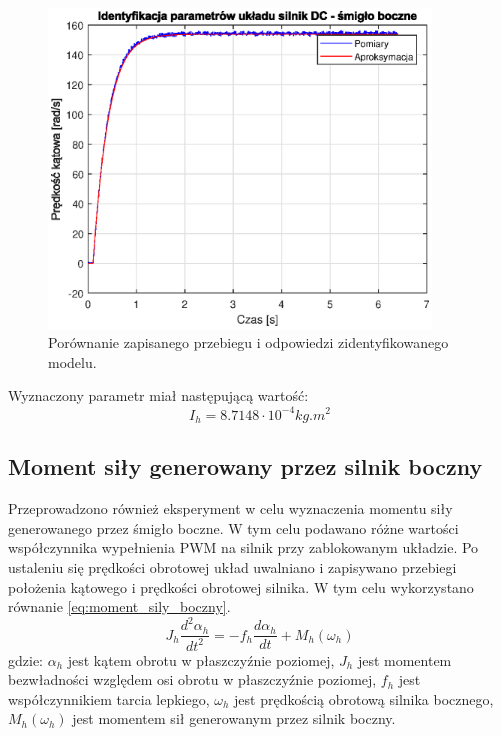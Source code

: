 \documentclass[11pt,a4paper]{article}
\begin{document}
\begin{figure}[H]
	\centering
	\includegraphics[width=4in]{Figures/ident_I_h.eps}
	\caption{Porównanie zapisanego przebiegu i odpowiedzi zidentyfikowanego modelu.}
	\label{fig:ident_I_h}
\end{figure}

Wyznaczony parametr miał następującą wartość:
\begin{equation}
I_h = 8.7148\cdot 10^{-4}\si{kg.m^2}
\end{equation}

\subsection{Moment siły generowany przez silnik boczny}
Przeprowadzono również eksperyment w celu wyznaczenia momentu siły generowanego przez śmigło boczne. W tym celu podawano różne wartości współczynnika wypełnienia PWM na silnik przy zablokowanym układzie. Po ustaleniu się prędkości obrotowej układ uwalniano i zapisywano przebiegi położenia kątowego i prędkości obrotowej silnika. W tym celu wykorzystano równanie \eqref{eq:moment_sily_boczny}.
\begin{equation}
J_h \frac{d^2\alpha_h}{dt^2} = -f_h\frac{d\alpha_h}{dt}+M_h(\omega_h)
\label{eq:moment_sily_boczny}
\end{equation}
\noindent gdzie:\newline
\(\alpha_h\) jest kątem obrotu w płaszczyźnie poziomej,\newline
\(J_h\) jest momentem bezwładności względem osi obrotu w płaszczyźnie poziomej,\newline
\(f_h\) jest współczynnikiem tarcia lepkiego,\newline
\(\omega_h\) jest prędkością obrotową silnika bocznego,\newline
\(M_h(\omega_h)\) jest momentem sił generowanym przez silnik boczny.
\end{document}
